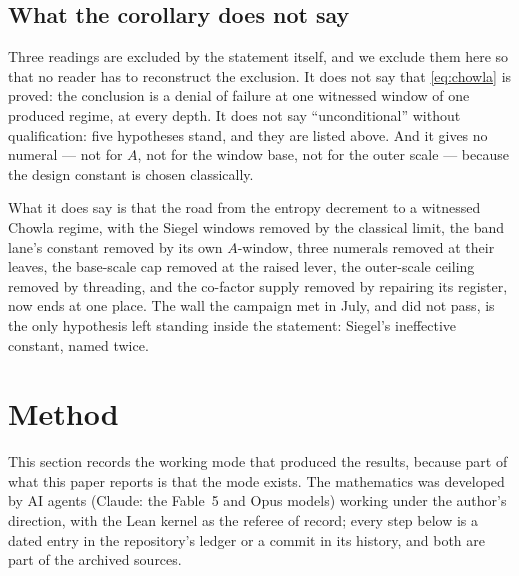 \documentclass[11pt]{amsart}
\theoremstyle{remark}
\begin{document}
\subsection{What the corollary does not say}
Three readings are excluded by the statement itself, and we exclude them here
so that no reader has to reconstruct the exclusion. It does not say that
\eqref{eq:chowla} is proved: the conclusion is a denial of failure at one
witnessed window of one produced regime, at every depth. It does not say
``unconditional'' without qualification: five hypotheses stand, and they are
listed above. And it gives no numeral --- not for $A$, not for the window base,
not for the outer scale --- because the design constant is chosen classically.

What it does say is that the road from the entropy decrement to a witnessed
Chowla regime, with the Siegel windows removed by the classical limit, the band
lane's constant removed by its own $A$-window, three numerals removed at their
leaves, the base-scale cap removed at the raised lever, the outer-scale ceiling
removed by threading, and the co-factor supply removed by repairing its
register, now ends at one place. The wall the campaign met in July, and did not
pass, is the only hypothesis left standing inside the statement: Siegel's
ineffective constant, named twice.

\section{Method}\label{sec:method}

This section records the working mode that produced the results,
because part of what this paper reports is that the mode exists. The
mathematics was developed by AI agents (Claude: the Fable~5 and Opus
models) working under the author's direction, with the Lean kernel as
the referee of record; every step below is a dated entry in the
repository's ledger or a commit in its history, and both are part of
the archived sources.
\end{document}
